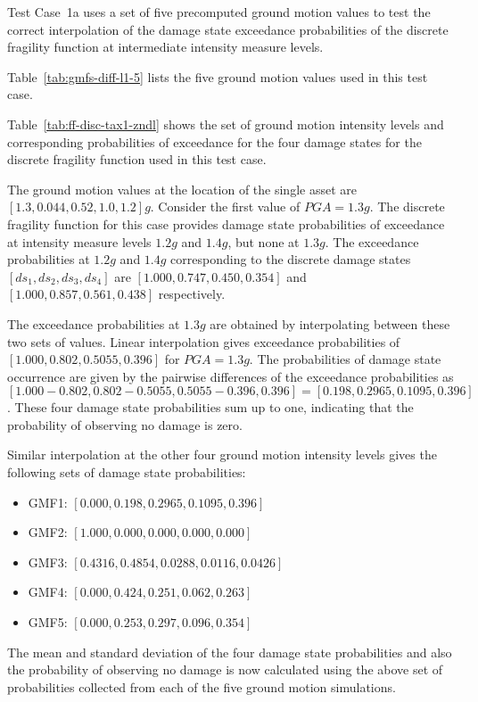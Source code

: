 Test Case~1a uses a set of five precomputed ground motion values to test the correct interpolation of the damage state exceedance probabilities of the discrete fragility function at intermediate intensity measure levels.

Table~\ref{tab:gmfs-diff-l1-5} lists the five ground motion values used in this test case.



Table~\ref{tab:ff-disc-tax1-zndl} shows the set of ground motion intensity levels and corresponding probabilities of exceedance for the four damage states for the discrete fragility function used in this test case.

The ground motion values at the location of the single asset are $[1.3, 0.044, 0.52, 1.0, 1.2] g$. Consider the first value of $PGA = 1.3 g$. The discrete fragility function for this case provides damage state probabilities of exceedance at intensity measure levels $1.2 g$ and $1.4 g$, but none at $1.3 g$. The exceedance probabilities at $1.2 g$ and $1.4 g$ corresponding to the discrete damage states $[ds_1, ds_2, ds_3, ds_4]$ are $[1.000, 0.747, 0.450, 0.354]$ and $[1.000, 0.857, 0.561, 0.438]$ respectively.

The exceedance probabilities at $1.3 g$ are obtained by interpolating between these two sets of values. Linear interpolation gives exceedance probabilities of $[1.000, 0.802, 0.5055, 0.396]$ for $PGA = 1.3 g$. The probabilities of damage state occurrence are given by the pairwise differences of the exceedance probabilities as $[1.000 - 0.802, 0.802 - 0.5055, 0.5055 - 0.396, 0.396] = [0.198, 0.2965, 0.1095, 0.396]$. These four damage state probabilities sum up to one, indicating that the probability of observing no damage is zero.

Similar interpolation at the other four ground motion intensity levels gives the following sets of damage state probabilities:

\begin{itemize}
	\item GMF1: $[0.000, 0.198, 0.2965, 0.1095, 0.396]$
	\item GMF2: $[1.000, 0.000, 0.000, 0.000, 0.000]$
	\item GMF3: $[0.4316, 0.4854, 0.0288, 0.0116, 0.0426]$
	\item GMF4: $[0.000, 0.424, 0.251, 0.062, 0.263]$
	\item GMF5: $[0.000, 0.253, 0.297, 0.096, 0.354]$
\end{itemize}

The mean and standard deviation of the four damage state probabilities and also the probability of observing no damage is now calculated using the above set of probabilities collected from each of the five ground motion simulations.
